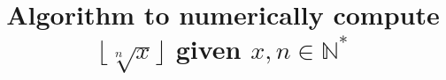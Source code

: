 \title{Algorithm to numerically compute $\lfloor \sqrt[n]{x} \rfloor$
       given $x, n \in \mathds{N}^*$}
